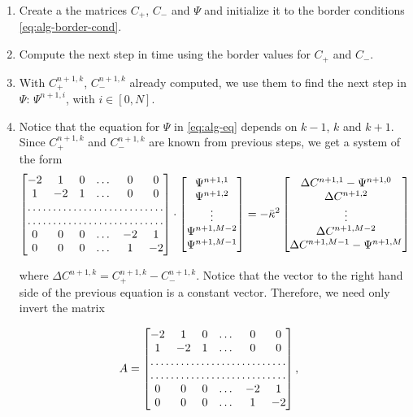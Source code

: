 \begin{enumerate}
\item Create a the matrices $C_+$, $C_-$ and $\Psi$ and initialize it to the border conditions \ref{eq:alg-border-cond}. 
\item Compute the next step in time using the border values for $C_+$ and $C_-$. 
\item With $C_+^{n+1, k}$, $C_-^{n+1, k}$ already computed, we use them to find the next step in $\Psi$: $\Psi^{n+1,i}$, with $i \in [0, N]$.
\item Notice that the equation for $\Psi$ in \ref{eq:alg-eq} depends on $k-1$, $k$ and $k+1$. Since $C_+^{n+1,k}$ and $C_-^{n+1,k}$ are known from previous steps, we get a system of the form
\begin{align}
\begin{bmatrix}
    -2       & 1  & 0 & \dots & 0   & 0\\
    1       & -2 & 1 & \dots & 0 & 0 \\
  \hdotsfor{6} \\
   \hdotsfor{6} \\  
   0       & 0 & 0 & \dots & -2 & 1 \\
   0       & 0 & 0 & \dots & 1 & -2 
\end{bmatrix}
\cdot \begin{bmatrix}
    \Psi^{n+1, 1}       \\
     \Psi^{n+1, 2}        \\
	\vdots \\
    \Psi^{n+1, M-2}        \\
    \Psi^{n+1, M-1}
\end{bmatrix} 
= -\bar{\kappa}^2 \begin{bmatrix}
    \Delta C^{n+1, 1}  -\Psi^{n+1, 0}     \\
     \Delta C^{n+1, 2}        \\
	\vdots \\
    \Delta C^{n+1, M-2}        \\
    \Delta C^{n+1, M-1}   -\Psi^{n+1, M} 
\end{bmatrix} 
\end{align}

where $\Delta C^{n+1,k} = C_+^{n+1,k}- C_-^{n+1, k}$. Notice that the vector to the right hand side of the previous equation is a constant vector. Therefore, we need only invert the matrix

\begin{align}
A &= \begin{bmatrix}
    -2       & 1  & 0 & \dots & 0   & 0\\
    1       & -2 & 1 & \dots & 0 & 0 \\
  \hdotsfor{6} \\
   \hdotsfor{6} \\  
   0       & 0 & 0 & \dots & -2 & 1 \\
   0       & 0 & 0 & \dots & 1 & -2 
\end{bmatrix},
\end{align}


\end{enumerate}
